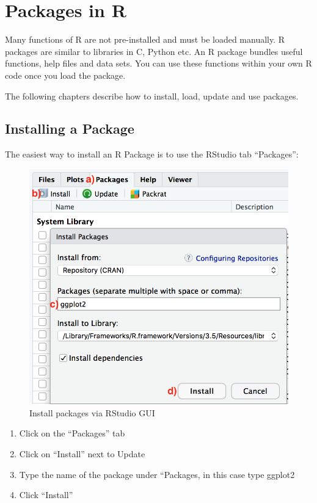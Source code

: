 \documentclass[
  a4paperpaper,
]{book}
\begin{document}
\hypertarget{appendix-appendix}{%
\appendix}


\hypertarget{packages}{%
\chapter{Packages in R}\label{packages}}

Many functions of R are not pre-installed and must be loaded manually. R packages are similar to libraries in C, Python etc. An R package bundles useful functions, help files and data sets. You can use these functions within your own R code once you load the package.

The following chapters describe how to install, load, update and use packages.

\newpage

\hypertarget{installing-a-package}{%
\section{Installing a Package}\label{installing-a-package}}

The easiest way to install an R Package is to use the RStudio tab ``Packages'':

\begin{figure}
\includegraphics[width=0.5\linewidth]{images/a2-installPackagesRStudio} \caption{Install packages via RStudio GUI}\label{fig:knitr-logo}
\end{figure}

\begin{enumerate}
\def\labelenumi{\alph{enumi})}
\item
  Click on the ``Packages'' tab
\item
  Click on ``Install'' next to Update
\item
  Type the name of the package under ``Packages, in this case type ggplot2
\item
  Click ``Install''
\end{enumerate}
\end{document}
